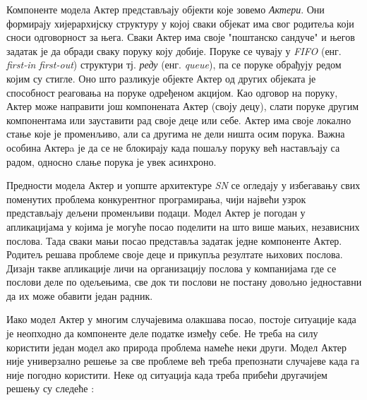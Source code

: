 \documentclass[12pt,oneside]{memoir}
\begin{document}
Компоненте модела Актер представљају објекти које зовемо \textit{Актери}. Они формирају хијерархијску структуру у којој сваки објекат има свог родитеља који сноси одговорност за њега. Сваки Актер има своје "поштанско сандуче" и његов задатак је да обради сваку поруку коју добије. Поруке се чувају у \textit{FIFO} (енг. \textit{first-in first-out}) структури тј. \textit{реду} (енг. \textit{queue}), па се поруке обрађују редом којим су стигле. Оно што разликује објекте Актер од других објеката је способност реаговања на поруке одређеном акцијом. Као одговор на поруку, Актер може направити још компонената Актер (своју децу), слати поруке другим компонентама или зауставити рад своје деце или себе. Актер има своје локално стање које је променљиво, али са другима не дели ништа осим порука. Важна особина Актерa је да се не блокирају када пошаљу поруку већ настављају са радом, односно слање порука је увек асинхроно. 

Предности модела Актер и уопште архитектуре \textit{SN} се огледају у избегавању свих поменутих проблема конкурентног програмирања, чији највећи узрок представљају дељени променљиви подаци. Модел Актер је погодан у апликацијама у којима је могуће посао поделити на што више мањих, независних послова. Тада сваки мањи посао представља задатак једне компоненте Актер. Родитељ решава проблеме своје деце и прикупља резултате њихових послова. Дизајн такве апликације личи на организацију послова у компанијама где се послови деле по одељењима, све док ти послови не постану довољно једноставни да их може обавити један радник. 

Иако модел Актер у многим случајевима олакшава посао, постоје ситуације када је неопходно да компоненте деле податке између себе. Не треба на силу користити један модел ако природа проблема намеће неки други. Модел Актер није универзално решење за све проблеме већ треба препознати случајеве када га није погодно користити. Неке од ситуација када треба прибећи другачијем решењу су следеће \cite{progInScala3}:
\end{document}
